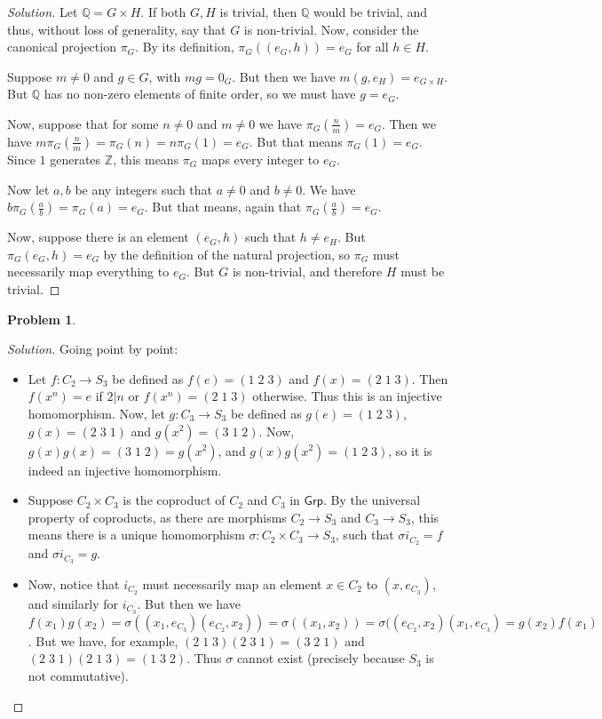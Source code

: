 \documentclass{article}
\theoremstyle{definition}
\newtheorem{problem-internal}{Problem}[subsection]
\newenvironment{problem}{
	\medskip
	\begin{problem-internal}
	}{
\end{problem-internal}
}
\newenvironment{solution}{
	\begin{proof}[Solution]
		\vspace{-8px}
		\setlength{\parskip}{4px}
		\setlength{\parindent}{0px}
	}{
\end{proof}
}
\begin{document}
\begin{solution}
	Let $\mathbb{Q}=G \times H$. If both $G, H$ is trivial, then $\mathbb{Q}$ would be trivial, and thus, without loss of generality, say that $G$ is non-trivial. Now, consider the canonical projection $\pi_G$. By its definition, $\pi_G((e_G,h))=e_G$ for all $h \in H$.
	
	Suppose $m \neq 0$ and $g \in G$, with $mg=0_G$. But then we have $m(g,e_H)=e_{G \times H}$. But $\mathbb{Q}$ has no non-zero elements of finite order, so we must have $g = e_G$.
	
	Now, suppose that for some $n \neq 0$ and $m \neq 0$ we have $\pi_G(\frac{n}{m})=e_G$. Then we have $m \pi_G(\frac{n}{m}) = \pi_G(n) = n \pi_G(1) = e_G$. But that means $\pi_G(1) = e_G$. Since $1$ generates $\mathbb{Z}$, this means $\pi_G$ maps every integer to $e_G$.
	
	Now let $a, b$ be any integers such that $a \neq 0$ and $b \neq 0$. We have $b \pi_G(\frac{a}{b}) = \pi_G(a) = e_G$. But that means, again that $\pi_G(\frac{a}{b}) = e_G$.
	
	Now, suppose there is an element $(e_G, h)$ such that $h \neq e_H$. But $\pi_G(e_G, h) = e_G$ by the definition of the natural projection, so $\pi_G$ must necessarily map everything to $e_G$. But $G$ is non-trivial, and therefore $H$ must be trivial. 
\end{solution}

\begin{problem}
\end{problem}

\begin{solution}
	Going point by point:
	\begin{itemize}
		\item Let $f: C_2 \to S_3$ be defined as $f(e) = (1\;2\;3)$ and $f(x) = (2\;1\;3)$. Then $f(x^n)=e$ if $2 | n$ or $f(x^n)=(2\;1\;3)$ otherwise. Thus this is an injective homomorphism. Now, let $g: C_3 \to S_3$ be defined as $g(e)=(1\;2\;3)$, $g(x)=(2\;3\;1)$ and $g(x^2)=(3\;1\;2)$. Now, $g(x)g(x)=(3\;1\;2)=g(x^2)$, and $g(x)g(x^2)=(1\;2\;3)$, so it is indeed an injective homomorphism.
		\item Suppose $C_2 \times C_3$ is the coproduct of $C_2$ and $C_3$ in $\mathsf{Grp}$. By the universal property of coproducts,  as there are morphisms $C_2 \to S_3$ and $C_3 \to S_3$, this means there is a unique homomorphism $\sigma: C_2 \times C_3 \to S_3$, such that $\sigma i_{C_2} = f$ and $\sigma i_{C_3} = g$.
		\item Now, notice that $i_{C_2}$ must necessarily map an element $x \in C_2$ to $(x, e_{C_3})$, and similarly for $i_{C_3}$. But then we have $f(x_1)g(x_2)=\sigma((x_1, e_{C_3})(e_{C_2}, x_2))=\sigma((x_1, x_2))=\sigma((e_{C_2}, x_2)(x_1, e_{C_3})=g(x_2)f(x_1)$. But we have, for example, $(2\;1\;3)(2\;3\;1)=(3\;2\;1)$ and $(2\;3\;1)(2\;1\;3)=(1\;3\;2)$. Thus $\sigma$ cannot exist (precisely because $S_3$ is not commutative).
	\end{itemize}
\end{solution}
\end{document}
